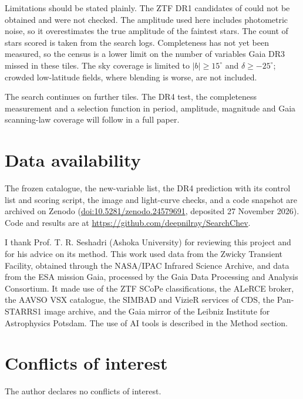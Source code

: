 \documentclass[twocolumn]{searchchev_preprint}
\begin{document}
Limitations should be stated plainly. The ZTF DR1 candidates of \citet{Ofek2020} could not be obtained and were not
checked. The amplitude used here includes photometric noise, so it overestimates the true amplitude of the faintest
stars. The count of stars scored is taken from the search logs. Completeness has not yet been measured, so the
census is a lower limit on the number of variables Gaia DR3 missed in these tiles. The sky coverage is limited to
$|b|\ge15^\circ$ and $\delta\ge-25^\circ$; crowded low-latitude fields, where blending is worse, are not included.

The search continues on further tiles. The DR4 test, the completeness measurement and a selection function in
period, amplitude, magnitude and Gaia scanning-law coverage will follow in a full paper.

\section*{Data availability}
The frozen catalogue, the new-variable list, the DR4 prediction with its control list and scoring script, the image and
light-curve checks, and a code snapshot are archived on Zenodo (\href{https://doi.org/10.5281/zenodo.24579691}{doi:10.5281/zenodo.24579691}, deposited 27 November 2026). Code and
results are at \url{https://github.com/deepnilray/SearchChev}.

\begin{acknowledgments}
I thank Prof. T. R. Seshadri (Ashoka University) for reviewing this project and for his advice on its method.
This work used data from the Zwicky Transient Facility, obtained through the NASA/IPAC Infrared Science Archive, and
data from the ESA mission Gaia, processed by the Gaia Data Processing and Analysis Consortium. It made use of the
ZTF SCoPe classifications, the ALeRCE broker, the AAVSO VSX catalogue, the SIMBAD and VizieR services of CDS, the
Pan-STARRS1 image archive, and the Gaia mirror of the Leibniz Institute for Astrophysics Potsdam. The use of AI tools is described in the Method section.
\end{acknowledgments}

\section*{Conflicts of interest}
The author declares no conflicts of interest.
\end{document}
